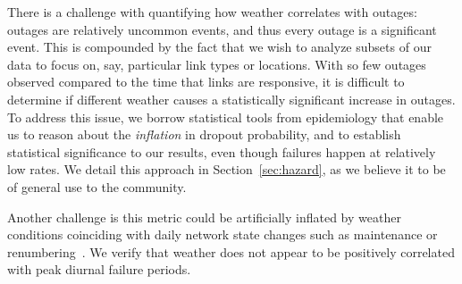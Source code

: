 There is a challenge with quantifying how weather correlates with
outages: outages are relatively uncommon events, and thus every outage
is a significant event.
%
%
This is compounded by the fact that we wish to analyze subsets of our
data to focus on, say, particular link types or locations.
%
With so few outages observed compared to the time that links are responsive,
it is difficult to determine if different weather causes a statistically significant
increase in outages.
%
To address this issue, we borrow statistical tools from epidemiology
that enable us to reason about the \emph{inflation} in dropout
probability, and to establish statistical significance to our results,
even though failures happen at relatively low rates.
%
We detail this approach in Section~\ref{sec:hazard}, as we believe it
to be of general use to the community.



Another challenge is this metric could be artificially inflated by
weather conditions coinciding with daily network state changes such as
maintenance or renumbering~\cite{addrchange-reasons}.
%
We verify that weather does not appear to be positively correlated with
peak diurnal failure periods.


